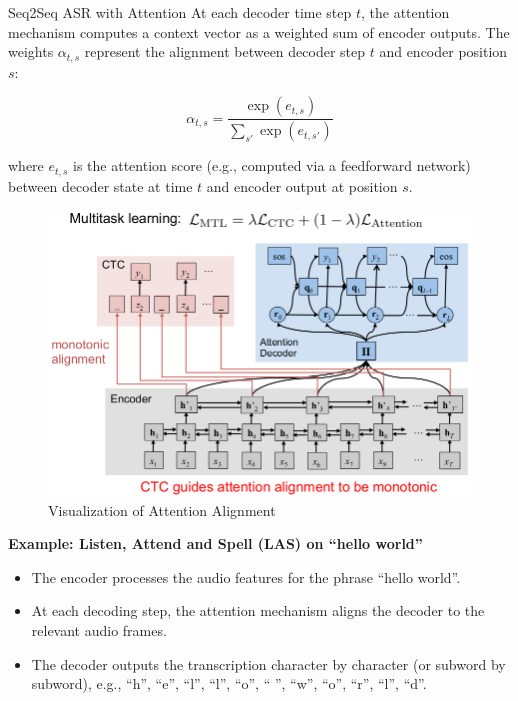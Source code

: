 \begin{frame}[allowframebreaks]{Seq2Seq ASR with Attention}
At each decoder time step $t$, the attention mechanism computes a context vector as a weighted sum of encoder outputs. The weights $\alpha_{t,s}$ represent the alignment between decoder step $t$ and encoder position $s$:

\begin{equation}
    \alpha_{t,s} = \frac{\exp(e_{t,s})}{\sum_{s'} \exp(e_{t,s'})}
\end{equation}

where $e_{t,s}$ is the attention score (e.g., computed via a feedforward network) between decoder state at time $t$ and encoder output at position $s$.

\begin{figure}[h]
    \centering
    \includegraphics[width=\textwidth,height=0.8\textheight,keepaspectratio]{images/audio-nlp/attention_alignment.png}
    \caption*{Visualization of Attention Alignment}
\end{figure}

\framebreak

\textbf{Example: Listen, Attend and Spell (LAS) on ``hello world''}

\begin{itemize}
    \item The encoder processes the audio features for the phrase ``hello world''.
    \item At each decoding step, the attention mechanism aligns the decoder to the relevant audio frames.
    \item The decoder outputs the transcription character by character (or subword by subword), e.g., ``h'', ``e'', ``l'', ``l'', ``o'', `` '', ``w'', ``o'', ``r'', ``l'', ``d''.
\end{itemize}


\end{frame}